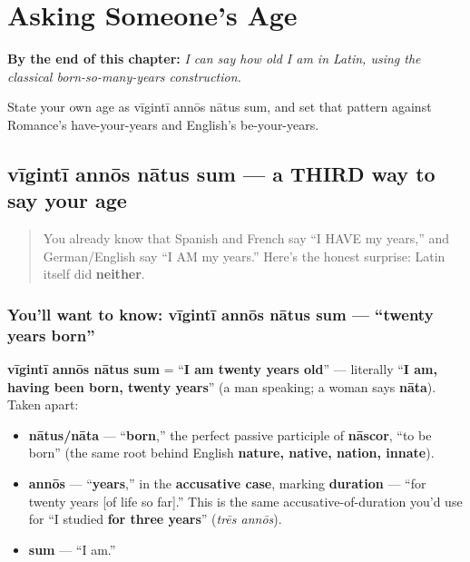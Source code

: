 
\chapter{Asking Someone's Age}
\label{ch:la-asking-age}

\begin{chapteropening}
\textbf{By the end of this chapter:} \emph{I can say how old I am in Latin, using the classical born-so-many-years construction.}

State your own age as vīgintī annōs nātus sum, and set that pattern against Romance's have-your-years and English's be-your-years.
\end{chapteropening}

\section[vīgintī annōs nātus sum]{vīgintī annōs nātus sum — a THIRD way to say your age}

\label{lesson:LA-C14-annos-natus}



\begin{quote}
You already know that Spanish and French say \textquotedblleft{}I HAVE my years,\textquotedblright{} and German/English say \textquotedblleft{}I AM my years.\textquotedblright{} Here's the honest surprise: Latin itself did \textbf{neither}.
\end{quote}

\subsection*{You'll want to know: vīgintī annōs nātus sum — \textquotedblleft{}twenty years born\textquotedblright{}}
\textbf{vīgintī annōs nātus sum} = \textquotedblleft{}\textbf{I am twenty years old}\textquotedblright{} — literally \textquotedblleft{}\textbf{I am, having been born, twenty years}\textquotedblright{} (a man speaking; a woman says \textbf{nāta}). Taken apart:

\begin{itemize}
\raggedright
  \item \textbf{nātus/nāta} — \textquotedblleft{}\textbf{born},\textquotedblright{} the perfect passive participle of \textbf{nāscor}, \textquotedblleft{}to be born\textquotedblright{} (the same root behind English \textbf{nature, native, nation, innate}).
  \item \textbf{annōs} — \textquotedblleft{}\textbf{years},\textquotedblright{} in the \textbf{accusative case}, marking \textbf{duration} — \textquotedblleft{}for twenty years {[}of life so far{]}.\textquotedblright{} This is the same accusative-of-duration you'd use for \textquotedblleft{}I studied \textbf{for three years}\textquotedblright{} (\emph{trēs annōs}).
  \item \textbf{sum} — \textquotedblleft{}I am.\textquotedblright{}
\end{itemize}

